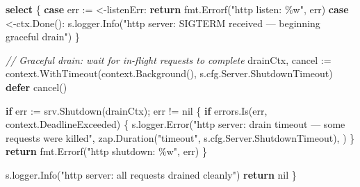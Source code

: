 \documentclass[
]{article}
\newenvironment{Shaded}{}{}
\newcommand{\CommentTok}[1]{\textcolor[rgb]{0.38,0.63,0.69}{\textit{#1}}}
\newcommand{\ControlFlowTok}[1]{\textcolor[rgb]{0.00,0.44,0.13}{\textbf{#1}}}
\newcommand{\NormalTok}[1]{#1}
\newcommand{\OperatorTok}[1]{\textcolor[rgb]{0.40,0.40,0.40}{#1}}
\newcommand{\OtherTok}[1]{\textcolor[rgb]{0.00,0.44,0.13}{#1}}
\newcommand{\StringTok}[1]{\textcolor[rgb]{0.25,0.44,0.63}{#1}}
\begin{document}
\begin{Shaded}
\begin{Highlighting}[]
    \ControlFlowTok{select} \OperatorTok{\{}
    \ControlFlowTok{case}\NormalTok{ err }\OperatorTok{:=} \OperatorTok{\textless{}{-}}\NormalTok{listenErr}\OperatorTok{:}
        \ControlFlowTok{return}\NormalTok{ fmt}\OperatorTok{.}\NormalTok{Errorf}\OperatorTok{(}\StringTok{"http listen: \%w"}\OperatorTok{,}\NormalTok{ err}\OperatorTok{)}
    \ControlFlowTok{case} \OperatorTok{\textless{}{-}}\NormalTok{ctx}\OperatorTok{.}\NormalTok{Done}\OperatorTok{():}
\NormalTok{        s}\OperatorTok{.}\NormalTok{logger}\OperatorTok{.}\NormalTok{Info}\OperatorTok{(}\StringTok{"http server: SIGTERM received — beginning graceful drain"}\OperatorTok{)}
    \OperatorTok{\}}

    \CommentTok{// Graceful drain: wait for in{-}flight requests to complete}
\NormalTok{    drainCtx}\OperatorTok{,}\NormalTok{ cancel }\OperatorTok{:=}\NormalTok{ context}\OperatorTok{.}\NormalTok{WithTimeout}\OperatorTok{(}\NormalTok{context}\OperatorTok{.}\NormalTok{Background}\OperatorTok{(),}\NormalTok{ s}\OperatorTok{.}\NormalTok{cfg}\OperatorTok{.}\NormalTok{Server}\OperatorTok{.}\NormalTok{ShutdownTimeout}\OperatorTok{)}
    \ControlFlowTok{defer}\NormalTok{ cancel}\OperatorTok{()}

    \ControlFlowTok{if}\NormalTok{ err }\OperatorTok{:=}\NormalTok{ srv}\OperatorTok{.}\NormalTok{Shutdown}\OperatorTok{(}\NormalTok{drainCtx}\OperatorTok{);}\NormalTok{ err }\OperatorTok{!=} \OtherTok{nil} \OperatorTok{\{}
        \ControlFlowTok{if}\NormalTok{ errors}\OperatorTok{.}\NormalTok{Is}\OperatorTok{(}\NormalTok{err}\OperatorTok{,}\NormalTok{ context}\OperatorTok{.}\NormalTok{DeadlineExceeded}\OperatorTok{)} \OperatorTok{\{}
\NormalTok{            s}\OperatorTok{.}\NormalTok{logger}\OperatorTok{.}\NormalTok{Error}\OperatorTok{(}\StringTok{"http server: drain timeout — some requests were killed"}\OperatorTok{,}
\NormalTok{                zap}\OperatorTok{.}\NormalTok{Duration}\OperatorTok{(}\StringTok{"timeout"}\OperatorTok{,}\NormalTok{ s}\OperatorTok{.}\NormalTok{cfg}\OperatorTok{.}\NormalTok{Server}\OperatorTok{.}\NormalTok{ShutdownTimeout}\OperatorTok{),}
            \OperatorTok{)}
        \OperatorTok{\}}
        \ControlFlowTok{return}\NormalTok{ fmt}\OperatorTok{.}\NormalTok{Errorf}\OperatorTok{(}\StringTok{"http shutdown: \%w"}\OperatorTok{,}\NormalTok{ err}\OperatorTok{)}
    \OperatorTok{\}}

\NormalTok{    s}\OperatorTok{.}\NormalTok{logger}\OperatorTok{.}\NormalTok{Info}\OperatorTok{(}\StringTok{"http server: all requests drained cleanly"}\OperatorTok{)}
    \ControlFlowTok{return} \OtherTok{nil}
\OperatorTok{\}}
\end{Highlighting}
\end{Shaded}
\end{document}
